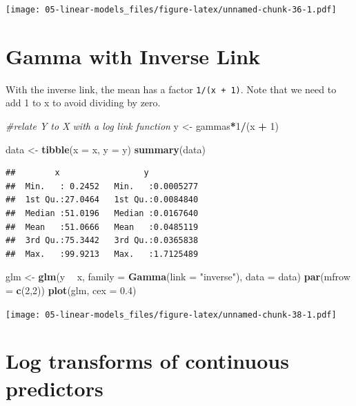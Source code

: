 \documentclass[openany]{book}
\newenvironment{Shaded}{\begin{snugshade}}{\end{snugshade}}
\newcommand{\CommentTok}[1]{\textcolor[rgb]{0.56,0.35,0.01}{\textit{#1}}}
\newcommand{\DataTypeTok}[1]{\textcolor[rgb]{0.13,0.29,0.53}{#1}}
\newcommand{\DecValTok}[1]{\textcolor[rgb]{0.00,0.00,0.81}{#1}}
\newcommand{\FloatTok}[1]{\textcolor[rgb]{0.00,0.00,0.81}{#1}}
\newcommand{\KeywordTok}[1]{\textcolor[rgb]{0.13,0.29,0.53}{\textbf{#1}}}
\newcommand{\NormalTok}[1]{#1}
\newcommand{\OperatorTok}[1]{\textcolor[rgb]{0.81,0.36,0.00}{\textbf{#1}}}
\newcommand{\StringTok}[1]{\textcolor[rgb]{0.31,0.60,0.02}{#1}}
\begin{document}
\texttt{[image: 05-linear-models\_files/figure-latex/unnamed-chunk-36-1.pdf]}

\hypertarget{gamma-with-inverse-link}{%
\section{Gamma with Inverse Link}\label{gamma-with-inverse-link}}

With the inverse link, the mean has a factor \texttt{1/(x\ +\ 1)}. Note that we need to add 1 to x to avoid dividing by zero.

\begin{Shaded}
\begin{Highlighting}[]
\CommentTok{#relate Y to X with a log link function}
\NormalTok{y <-}\StringTok{ }\NormalTok{gammas}\OperatorTok{*}\DecValTok{1}\OperatorTok{/}\NormalTok{(x }\OperatorTok{+}\StringTok{ }\DecValTok{1}\NormalTok{)}

\NormalTok{data <-}\StringTok{ }\KeywordTok{tibble}\NormalTok{(}\DataTypeTok{x =}\NormalTok{ x, }\DataTypeTok{y  =}\NormalTok{ y)}
\KeywordTok{summary}\NormalTok{(data)}
\end{Highlighting}
\end{Shaded}

\begin{verbatim}
##        x                 y            
##  Min.   : 0.2452   Min.   :0.0005277  
##  1st Qu.:27.0464   1st Qu.:0.0084840  
##  Median :51.0196   Median :0.0167640  
##  Mean   :51.0666   Mean   :0.0485119  
##  3rd Qu.:75.3442   3rd Qu.:0.0365838  
##  Max.   :99.9213   Max.   :1.7125489
\end{verbatim}

\begin{Shaded}
\begin{Highlighting}[]
\NormalTok{glm <-}\StringTok{ }\KeywordTok{glm}\NormalTok{(y }\OperatorTok{~}\StringTok{ }\NormalTok{x, }\DataTypeTok{family =} \KeywordTok{Gamma}\NormalTok{(}\DataTypeTok{link =} \StringTok{"inverse"}\NormalTok{), }\DataTypeTok{data =}\NormalTok{ data)}
\KeywordTok{par}\NormalTok{(}\DataTypeTok{mfrow =} \KeywordTok{c}\NormalTok{(}\DecValTok{2}\NormalTok{,}\DecValTok{2}\NormalTok{))}
\KeywordTok{plot}\NormalTok{(glm, }\DataTypeTok{cex =} \FloatTok{0.4}\NormalTok{)}
\end{Highlighting}
\end{Shaded}

\texttt{[image: 05-linear-models\_files/figure-latex/unnamed-chunk-38-1.pdf]}

\hypertarget{log-transforms-of-continuous-predictors}{%
\section{Log transforms of continuous predictors}\label{log-transforms-of-continuous-predictors}}
\end{document}
